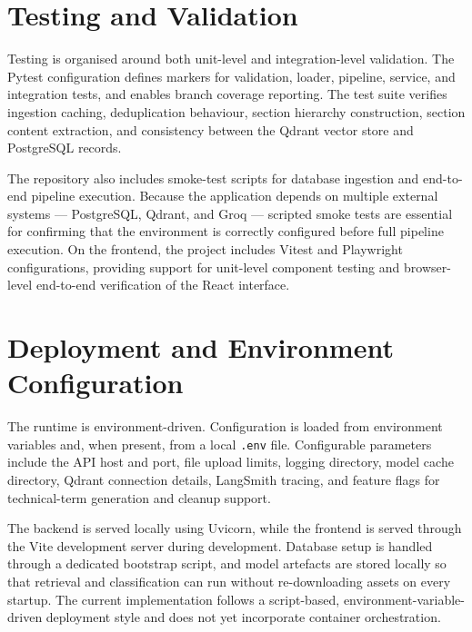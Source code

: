 \documentclass[12pt,a4paper]{report}
\begin{document}
\section{Testing and Validation}

Testing is organised around both unit-level and integration-level validation.
The Pytest configuration defines markers for validation, loader, pipeline,
service, and integration tests, and enables branch coverage reporting. The test
suite verifies ingestion caching, deduplication behaviour, section hierarchy
construction, section content extraction, and consistency between the Qdrant
vector store and PostgreSQL records.

The repository also includes smoke-test scripts for database ingestion and
end-to-end pipeline execution. Because the application depends on multiple
external systems — PostgreSQL, Qdrant, and Groq — scripted smoke tests are
essential for confirming that the environment is correctly configured before
full pipeline execution. On the frontend, the project includes Vitest and
Playwright configurations, providing support for unit-level component testing
and browser-level end-to-end verification of the React interface.

\section{Deployment and Environment Configuration}

The runtime is environment-driven. Configuration is loaded from environment
variables and, when present, from a local \texttt{.env} file. Configurable
parameters include the API host and port, file upload limits, logging directory,
model cache directory, Qdrant connection details, LangSmith tracing, and feature
flags for technical-term generation and cleanup support.

The backend is served locally using Uvicorn, while the frontend is served
through the Vite development server during development. Database setup is
handled through a dedicated bootstrap script, and model artefacts are stored
locally so that retrieval and classification can run without re-downloading
assets on every startup. The current implementation follows a script-based,
environment-variable-driven deployment style and does not yet incorporate
container orchestration.
\end{document}
